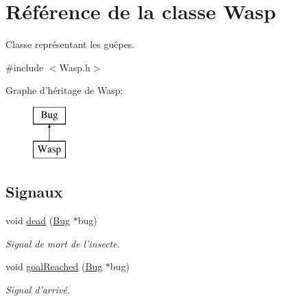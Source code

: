 \hypertarget{classWasp}{
\section{Référence de la classe Wasp}
\label{classWasp}
}


Classe représentant les guêpes.  




{\ttfamily \#include $<$Wasp.h$>$}

Graphe d'héritage de Wasp:\begin{figure}[H]
\begin{center}
\leavevmode
\includegraphics[height=2.000000cm]{classWasp}
\end{center}
\end{figure}
\subsection*{Signaux}
\begin{DoxyCompactItemize}
\item 
void \hyperlink{classBug_ab7379f5a0172e2d536e20f3f29915e02}{dead} (\hyperlink{classBug}{Bug} $\ast$bug)
\begin{DoxyCompactList}\small\item\em Signal de mort de l'insecte. \end{DoxyCompactList}\item 
void \hyperlink{classBug_a33f90dffa55e1dce80dc2416c75a53c8}{goalReached} (\hyperlink{classBug}{Bug} $\ast$bug)
\begin{DoxyCompactList}\small\item\em Signal d'arrivé. \end{DoxyCompactList}\end{DoxyCompactItemize}
